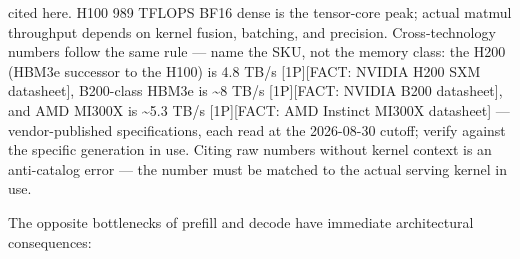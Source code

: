 \begin{itemize}
  cited here. H100 989 TFLOPS BF16 dense is the tensor-core peak; actual
  matmul throughput depends on kernel fusion, batching, and precision.
  Cross-technology numbers follow the same rule --- name the SKU, not
  the memory class: the H200 (HBM3e successor to the H100) is 4.8 TB/s
  \mbox{{[}1P{]}}{[}FACT: NVIDIA H200 SXM datasheet{]}, B200-class HBM3e is
  \textasciitilde8 TB/s \mbox{{[}1P{]}}{[}FACT: NVIDIA B200 datasheet{]}, and
  AMD MI300X is \textasciitilde5.3 TB/s \mbox{{[}1P{]}}{[}FACT: AMD Instinct
  MI300X datasheet{]} --- vendor-published specifications, each read at
  the 2026-08-30 cutoff; verify against the specific generation in use.
  Citing raw numbers without kernel context is an anti-catalog error ---
  the number must be matched to the actual serving kernel in use.
\end{itemize}

\label{architecture-consequence}


The opposite bottlenecks of prefill and decode have immediate
architectural consequences:

